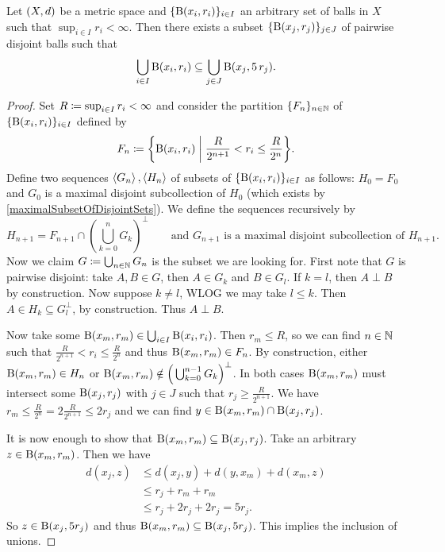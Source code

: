 \begin{proposition} \label{5foldCoveringLemma}
Let $\sSet{X,d}$ be a metric space and $\{\operatorname{B}(x_i, r_i)\}_{i\in I}$ an arbitrary set of balls in $X$ such that $\sup_{i\in I}r_i < \infty$. Then there exists a subset $\{\operatorname{B}(x_j, r_j)\}_{j\in J}$ of pairwise disjoint balls such that
\[ \bigcup_{i\in I}\operatorname{B}(x_i, r_i) \subseteq \bigcup_{j\in J} \operatorname{B}(x_j, 5\, r_j). \]
\end{proposition}
\begin{proof}
Set $R \coloneqq \sup_{i\in I}r_i < \infty$ and consider the partition $\{F_n\}_{n\in \mathbb{N}}$ of $\{\operatorname{B}(x_i, r_i)\}_{i\in I}$ defined by
\[ F_n \defeq \setbuilder{\ball(x_i, r_i)}{\frac{R}{2^{n+1}} < r_i \leq \frac{R}{2^n}}. \]
Define two sequences $\left\langle G_n \right\rangle, \left\langle H_n \right\rangle$ of subsets of $\{\operatorname{B}(x_i, r_i)\}_{i\in I}$ as follows: $H_0 = F_0$ and $G_0$ is a maximal disjoint subcollection of $H_0$ (which exists by \ref{maximalSubsetOfDisjointSets}). We define the sequences recursively by
\[ H_{n+1} = F_{n+1} \cap \left(\bigcup_{k=0}^nG_k\right)^\perp \qquad\text{and $G_{n+1}$ is a maximal disjoint subcollection of $H_{n+1}$.} \]
Now we claim $G \coloneqq \bigcup_{n\in\mathbb{N}}G_n$ is the subset we are looking for. First note that $G$ is pairwise disjoint: take $A,B\in G$, then $A\in G_k$ and $B\in G_l$. If $k = l$, then $A\perp B$ by construction. Now suppose $k\neq l$, WLOG we may take $l\leq k$. Then $A\in H_k \subseteq G_l^\perp$, by construction. Thus $A\perp B$.

Now take some $\operatorname{B}(x_m, r_m) \in \bigcup_{i\in I}\operatorname{B}(x_i, r_i)$. Then $r_m \leq R$, so we can find $n\in \mathbb{N}$ such that $\frac{R}{2^{n+1}} < r_i \leq \frac{R}{2^n}$ and thus $\operatorname{B}(x_m, r_m)\in F_n$. By construction, either $\operatorname{B}(x_m, r_m)\in H_n$ or $\operatorname{B}(x_m, r_m)\notin \Big(\bigcup_{k=0}^{n-1}G_k\Big)^\perp$. In both cases $\operatorname{B}(x_m, r_m)$ must intersect some $\operatorname{B}(x_j, r_j)$ with $j\in J$ such that $r_j \geq \frac{R}{2^{n+1}}$. We have $r_m \leq \frac{R}{2^n} = 2 \frac{R}{2^{n+1}} \leq 2 r_j$ and we can find $y\in \operatorname{B}(x_m, r_m) \cap \operatorname{B}(x_j, r_j)$.

It is now enough to show that $\operatorname{B}(x_m, r_m) \subseteq \operatorname{B}(x_j, r_j)$. Take an arbitrary $z\in \operatorname{B}(x_m, r_m)$. Then we have
\begin{align*}
d(x_j, z) &\leq d(x_j, y) + d(y, x_m) + d(x_m, z) \\
&\leq r_j + r_m + r_m \\
&\leq r_j + 2r_j + 2r_j = 5r_j.
\end{align*}
So $z\in \operatorname{B}(x_j, 5r_j)$ and thus $\operatorname{B}(x_m, r_m)\subseteq\operatorname{B}(x_j, 5r_j)$. This implies the inclusion of unions.
\end{proof}
